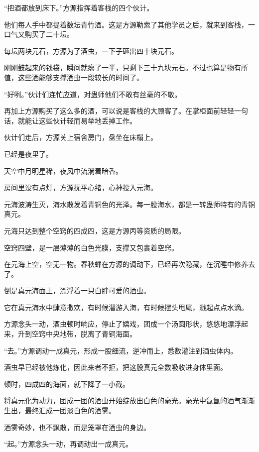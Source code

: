 
\begin{this_body}

“把酒都放到床下。”方源指挥着客栈的四个伙计。

他们每人手中都提着数坛青竹酒。这是方源勒索了其他学员之后，就来到客栈，一口气又购买了二十坛。

每坛两块元石，方源为了酒虫，一下子砸出四十块元石。

刚刚鼓起来的钱袋，瞬间就瘪了一半，只剩下三十九块元石。不过也算是物有所值，这些酒能够支撑酒虫一段较长的时间了。

“好咧。”伙计们连忙应道，对蛊师他们不敢有丝毫的不敬。

再加上方源购买了这么多的酒，可以说是客栈的大顾客了。在掌柜面前轻轻一句话，就能让这些伙计轻而易举地丢掉工作。

伙计们走后，方源关上宿舍房门，盘坐在床榻上。

已经是夜里了。

天空中月明星稀，夜风中流淌着暗香。

房间里没有点灯，方源抚平心绪，心神投入元海。

元海波涛生灭，海水散发着青铜色的光泽。每一股海水，都是一转蛊师特有的青铜真元。

元海只达到整个空窍的四成四，这是方源丙等资质的局限。

空窍四壁，是一层薄薄的白色光膜，支撑又包裹着空窍。

在元海上空，空无一物。春秋蝉在方源的调动下，已经再次隐藏，在沉睡中修养去了。

倒是真元海面上，漂浮着一只白胖可爱的酒虫。

它在真元海水中肆意撒欢，有时候潜游入海，有时候摆头甩尾，溅起点点水滴。

方源念头一动，酒虫顿时响应，停止了嬉戏，团成一个汤圆形状，悠悠地漂浮起来，升到空窍中央地带，脱离了青铜海面。

“去。”方源调动一成真元，形成一股细流，逆冲而上，悉数灌注到酒虫体内。

酒虫早已经被他炼化，因此来者不拒，把这股真元全数吸收进身体里面。

顿时，四成四的海面，就下降了一小截。

将真元化为动力，团成一团的酒虫开始绽放出白色的毫光。毫光中氤氲的酒气渐渐生出，最终汇成一团淡白色的酒雾。

酒雾奇妙，也不飘散，而是笼罩在酒虫的身边。

“起。”方源念头一动，再调动出一成真元。


\end{this_body}
